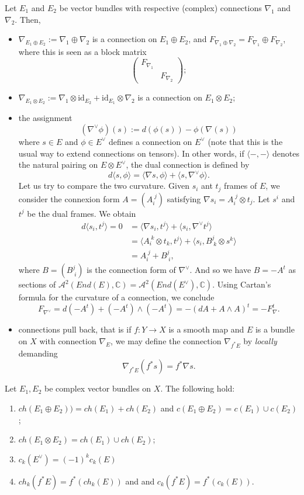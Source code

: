 \documentclass[11pt]{amsart}
\newcommand{\cA}{\mathcal{A}}
\newcommand{\C}{\mathbb C}
\newcommand{\id}{\text{id}}
\theoremstyle{definition}
\numberwithin{equation}{section}
\begin{document}
	Let $E_1$ and $E_2$ be vector bundles with respective (complex) connections $\nabla_1$ and $\nabla_2$. Then,
	\begin{itemize}
		\item $\nabla_{E_1\oplus E_2}:=\nabla_1\oplus\nabla_2$ is a connection on $E_1\oplus E_2$, and $F_{\nabla_1\oplus\nabla_2}=F_{\nabla_1}\oplus F_{\nabla_2}$, where this is seen as a block matrix
		\[\begin{pmatrix}
			F_{\nabla_1}&\\&F_{\nabla_2}
		\end{pmatrix}; \]
		\item $\nabla_{E_1\otimes E_2}:=\nabla_1\otimes \id_{E_2}+\id_{E_1}\otimes \nabla_2$ is a connection on $E_1\otimes E_2$;
		\item the assignment
		\[
		(\nabla^\vee \phi)(s):=d(\phi(s))-\phi(\nabla(s))
		\]
		where $s\in E$ and $\phi\in E^\vee$ defines a connection on $E^\vee$ (note that this is the usual way to extend connections on tensors). In other words, if $\langle-,-\rangle$ denotes the natural pairing on $E\otimes E^\vee$, the dual connection is defined by
		\[
		d\langle s,\phi\rangle=\langle\nabla s,\phi\rangle+\langle s,\nabla^\vee \phi\rangle.
		\]
		Let us try to compare the two curvature. Given $s_i$ ant $t_j$ frames of $E$, we consider the connexion form $A=(A_i^{\;j})$ satisfying $\nabla s_i=A_i^{\;j}\otimes t_j$. Let $s^i$ and $t^j$ be the dual frames. We obtain
		\begin{align*}
			d\langle s_i,t^j\rangle=0&=\langle \nabla s_i,t^j\rangle+\langle s_i,\nabla^\vee t^j\rangle\\
			&=\langle A_i^{\;k}\otimes t_k,t^j\rangle+\langle s_i,B^j_{\;k}\otimes s^k\rangle\\
			&=A_i^{\;j}+B^j_{\; i},
		\end{align*}
		where $B=(B^j_{\; i})$ is the connection form of $\nabla^\vee$. And so we have $B=-A^t$ as sections of $\cA^2(End(E),\C)=\cA^2(End(E^\vee),\C)$. Using Cartan's formula for the curvature of a connection, we conclude
		\[
		F_{\nabla^\vee}=d(-A^t)+(-A^t)\wedge(-A^t)=-(dA+A\wedge A)^t=-F_{\nabla}^t.
		\]
		\item connections pull back, that is if $f:Y\to X$ is a smooth map and $E$ is a bundle on $X$ with connection $\nabla_E$, we may define the connection $\nabla_{f^*E}$ by \emph{locally} demanding
		\[
		\nabla_{f^*E}(f^*s)=f^*\nabla s.
		\]
	\end{itemize}


\begin{corollary}
	Let $E_1,E_2$ be complex vector bundles on $X$. The following hold:
	\begin{enumerate}
		\item $ch(E_1\oplus E_2))=ch(E_1)+ch(E_2)$ and $c(E_1\oplus E_2)=c(E_1)\cup c(E_2)$;
		\item $ch(E_1\otimes E_2)=ch(E_1)\cup ch(E_2)$;
		\item $c_k(E^\vee)=(-1)^k c_k(E)$
		\item $ch_k(f^*E)=f^*(ch_k(E))$ and  and $c_k(f^*E)=f^*(c_k(E))$.
	\end{enumerate}
\end{corollary}
\end{document}
